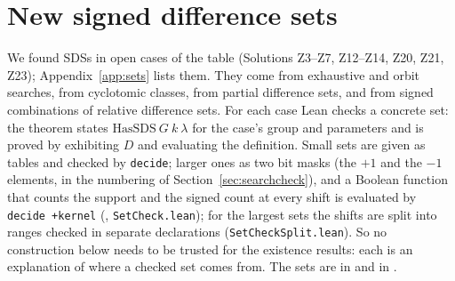 
\section{New signed difference sets}\label{sec:constructions}

We found SDSs in \ourExists{} open cases of the table (Solutions Z3--Z7, Z12--Z14, Z20, Z21,
Z23); Appendix~\ref{app:sets} lists them. They come from exhaustive and orbit searches, from
cyclotomic classes, from partial difference sets, and from signed combinations of relative
difference sets. For each case Lean checks a concrete set: the theorem
 states $\mathrm{HasSDS}\ G\ k\ \lambda$ for the case's group and
parameters and is proved by exhibiting $D$ and evaluating the definition. Small sets are given
as tables and checked by \texttt{decide}; larger ones as two bit masks (the $+1$ and the $-1$
elements, in the numbering of Section~\ref{sec:searchcheck}), and a Boolean function that
counts the support and the signed count at every shift is evaluated by
\texttt{decide +kernel} (, \texttt{SetCheck.lean}); for the largest
sets the shifts are split into ranges checked in separate declarations
(\texttt{SetCheckSplit.lean}). So no construction below needs to be trusted for the existence
results: each is an explanation of where a checked set comes from. The sets are in
 and in .

